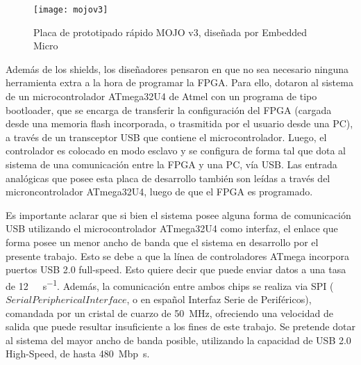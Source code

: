 \begin{figure}[ht]
	\centering
	\texttt{[image: mojov3]}
	\caption{Placa de prototipado rápido MOJO v3, diseñada por Embedded Micro}
	\label{mojo}
\end{figure}

Además de los shields, los diseñadores pensaron en que no sea necesario ninguna herramienta extra a la hora de programar la FPGA. Para ello, dotaron al sistema de un microcontrolador ATmega32U4 de Atmel con un programa de tipo bootloader, que se encarga de transferir la configuración del FPGA (cargada desde una memoria flash incorporada, o trasmitida por el usuario desde una PC), a través de un transceptor USB que contiene el microcontrolador. Luego, el controlador es colocado en modo esclavo y se configura de forma tal que dota al sistema de una comunicación entre la FPGA y una PC, vía USB. Las entrada analógicas que posee esta placa de desarrollo también son leídas a través del microncontrolador ATmega32U4, luego de que el FPGA es programado.%

Es importante aclarar que si bien el sistema posee alguna forma de comunicación USB utilizando el microcontrolador ATmega32U4 como interfaz, el enlace que forma posee un menor ancho de banda que el sistema en desarrollo por el presente trabajo. Esto se debe a que la línea de controladores ATmega incorpora puertos USB 2.0 full-speed. Esto quiere decir que puede enviar datos a una tasa de \SI{12}{\mega\bit\per\second}. Además, la comunicación entre ambos chips se realiza via SPI (\(Serial Peripherical Interface\), o en español Interfaz Serie de Periféricos), comandada por un cristal de cuarzo de \SI{50}{\mega\hertz}, ofreciendo una velocidad de salida que puede resultar insuficiente a los fines de este trabajo. Se pretende dotar al sistema del mayor ancho de banda posible, utilizando la capacidad de USB 2.0 High-Speed, de hasta \SI{480}{\mega bp\second}.%